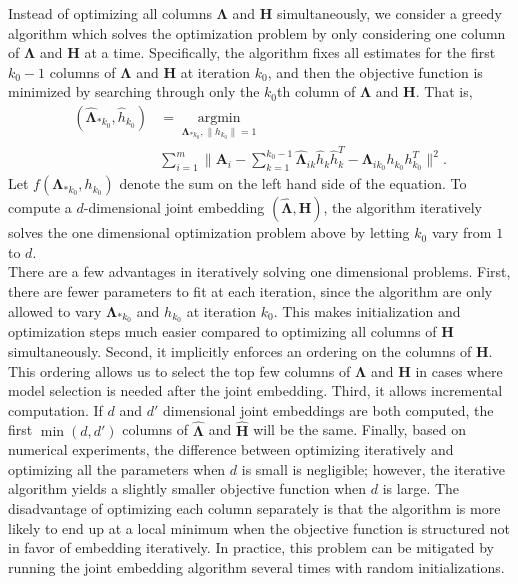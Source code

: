 \documentclass[10pt,journal,compsoc]{IEEEtran}
\newcommand{\bA}{\mathbf{A}}
\newcommand{\bH}{\mathbf{H}}
\newcommand{\bLambda}{\mathbf{\Lambda}}
\begin{document}
\noindent Instead of optimizing all columns $\bLambda$ and $\bH$ simultaneously, we consider a greedy algorithm which solves the optimization problem by only considering one column of  $\bLambda$ and $\bH$ at a time. Specifically, the algorithm fixes all estimates for the first $k_0-1$ columns of $\bLambda$ and $\bH$ at iteration $k_0$, and then the objective function is minimized by searching through only the $k_0$th column of $\bLambda$ and $\bH$. That is,
\begin{align}(\hat{\bLambda}_{*k_0},\hat{h}_{k_0}) &= \underset{\bLambda_{*k_0},\|h_{k_0}\|=1}{\operatorname{argmin}} \nonumber\\ &\sum\limits_{i=1}^{m} \| \bA_i- \sum\limits_{k=1}^{k_0-1} \hat{\bLambda}_{ik} \hat{h}_{k} \hat{h}_{k}^T -\bLambda_{ik_0} h_{k_0} h_{k_0}^T\|  ^2.
\label{eq:2}
\end{align} 
Let $f(\bLambda_{*k_0},h_{k_0})$ denote the sum on the left hand side of the equation. To compute a $d$-dimensional joint embedding $(\hat{\bLambda},\hat{\bH})$, the algorithm iteratively solves the one dimensional optimization problem above by letting $k_0$ vary from $1$ to $d$. \\

\noindent There are a few advantages in iteratively solving one dimensional problems. First, there are fewer parameters to fit at each iteration, since the algorithm are only allowed to vary $\bLambda_{*k_0}$ and $h_{k_0}$ at iteration $k_0$. This makes initialization and optimization steps much easier compared to optimizing all columns of $\bH$ simultaneously. Second, it implicitly enforces an ordering on the columns of $\bH$. This ordering allows us to select the top few columns of $\bLambda$ and $\bH$ in cases where model selection is needed after the joint embedding. Third, it allows incremental computation. If $d$ and $d'$ dimensional joint embeddings are both computed, the first $\min(d,d')$ columns of $\hat{\bLambda}$ and $\hat{\bH}$ will be the same. Finally, based on numerical experiments, the difference between optimizing iteratively and optimizing all the parameters when $d$ is small is negligible; however, the iterative algorithm yields a slightly smaller objective function when $d$ is large. The disadvantage of optimizing each column separately is that the algorithm is more likely to end up at a local minimum when the objective function is structured not in favor of embedding iteratively. In practice, this problem can be mitigated by running the joint embedding algorithm several times with random initializations. \\ 
\end{document}
